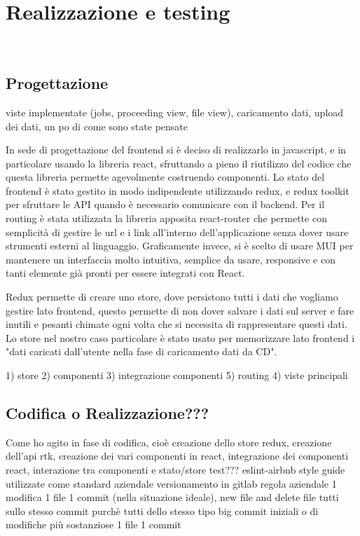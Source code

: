 
\chapter{Realizzazione e testing}
\label{cap:realiazzazione-testing}

\\

\section{Progettazione}
\label{sec:progettazione}
viste implementate (jobs, proceeding view, file view), caricamento dati, upload dei dati, un po di come sono state pensate

In sede di progettazione del frontend si è deciso di realizzarlo in javascript, e in particolare usando la libreria react, sfruttando a pieno il riutilizzo del codice che questa libreria permette agevolmente costruendo componenti.
Lo stato del frontend è stato gestito in modo indipendente utilizzando redux, e redux toolkit per sfruttare le API quando è necessario comunicare con il backend.
Per il routing è stata utilizzata la libreria apposita react-router che permette con semplicità di gestire le url e i link all'interno dell'applicazione senza dover usare strumenti esterni al linguaggio.
Graficamente invece, si è scelto di usare MUI per mantenere un interfaccia molto intuitiva, semplice da usare, responsive e con tanti elemente già pronti per essere integrati con React.

Redux permette di creare uno store, dove persistono tutti i dati che vogliamo gestire lato frontend, questo permette di non dover salvare i dati sul server e fare inutili e pesanti chimate ogni volta che si necessita di rappresentare questi dati.
Lo store nel nostro caso particolare è stato usato per memorizzare lato frontend i "dati caricati dall'utente nella fase di caricamento dati da CD".

1) store
2) componenti
3) integrazione componenti
5) routing
4) viste principali


\section{Codifica o Realizzazione???}
Come ho agito in fase di codifica, cioè creazione dello store redux, creazione dell'api rtk, creazione dei vari componenti in react, integrazione dei componenti react, interazione tra componenti e stato/store test???
eslint-airbnb style guide utilizzate come standard aziendale
versionamento in gitlab regola aziendale 1 modifica 1 file 1 commit (nella situazione ideale), new file and delete file tutti sullo stesso commit purchè tutti dello stesso tipo
big commit iniziali o di modifiche più sostanziose 1 file 1 commit

